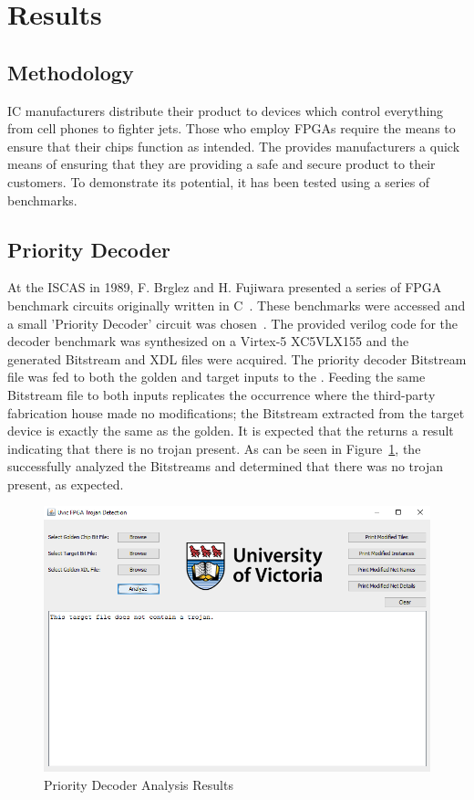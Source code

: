 \label{chapter:eval}
\section{Results}
\subsection{Methodology}
\acrlong{IC} manufacturers distribute their product to devices which control everything from cell phones to fighter jets. 
Those who employ \acrlong{FPGAs} require the means to ensure that their chips function as intended. 
The \NameNoPeriod provides manufacturers a quick means of ensuring that they are providing a safe and secure product to their customers.
To demonstrate its potential, it has been tested using a series of benchmarks.
\subsection{Priority Decoder} \label{sec:priorityDecoder}
At the \acrfull{ISCAS} in 1989, F. Brglez and H. Fujiwara presented a series of \acrshort{FPGA} benchmark circuits originally written in C~\cite{iscas85}. 
These benchmarks were accessed and a small 'Priority Decoder' circuit was chosen~\cite{iscasBenchmarks}.
The provided verilog code for the decoder benchmark was synthesized on a Virtex-5 XC5VLX155 and the generated \gls{Bitstream} and \acrshort{XDL} files were acquired.
The priority decoder \gls{Bitstream} file was fed to both the \gls{golden} and \gls{target} inputs to the \Name.
Feeding the same \gls{Bitstream} file to both inputs replicates the occurrence where the third-party fabrication house made no modifications; the \gls{Bitstream} extracted from the \gls{target} device is exactly the same as the \gls{golden}.
It is expected that the \NameNoPeriod returns a result indicating that there is no trojan present.
As can be seen in Figure~\ref{fig:priorityDecoder}, the \NameNoPeriod successfully analyzed the \gls{Bitstream}s and determined that there was no trojan present, as expected.
\begin{figure}
\centering
\includegraphics[width=1\linewidth]{Figures/priorityDecoder}
\caption[Priority Decoder Analysis Results]{Priority Decoder Analysis Results}
\label{fig:priorityDecoder}
\end{figure}

